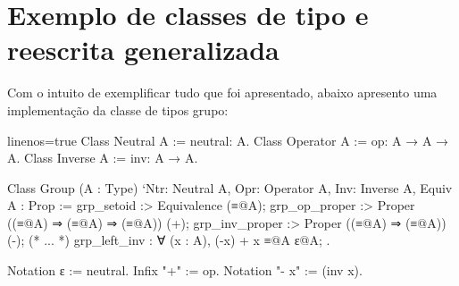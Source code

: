 \section{Exemplo de classes de tipo e reescrita generalizada}\label{sec:exemplos}
Com o intuito de exemplificar tudo que foi apresentado, abaixo apresento uma implementação da classe de tipos grupo: \\
\begin{minipage}[t]{0.5\linewidth}
\begin{coqcode*}{linenos=true}
Class Neutral A := neutral: A.
Class Operator A := op: A → A → A.
Class Inverse A := inv: A → A.

Class Group (A : Type)
  `{Ntr: Neutral A, Opr: Operator A, Inv: Inverse A, Equiv A} : Prop := {
	grp_setoid :> Equivalence (≡@{A});
	grp_op_proper :> Proper ((≡@{A}) ⇒ (≡@{A}) ⇒ (≡@{A})) (+);
	grp_inv_proper :> Proper ((≡@{A}) ⇒ (≡@{A})) (-);
	(* ... *)
	grp_left_inv : ∀ (x : A), (-x) + x ≡@{A} ɛ@{A};
}.
\end{coqcode*}
\end{minipage}
\hspace{-1em}
\begin{minipage}[t]{0.5\linewidth}
\begin{coqcode}
Notation ɛ := neutral.
Infix "+" := op.
Notation "- x" := (inv x).
\end{coqcode}
\end{minipage}\vspace*{.6em}\\
